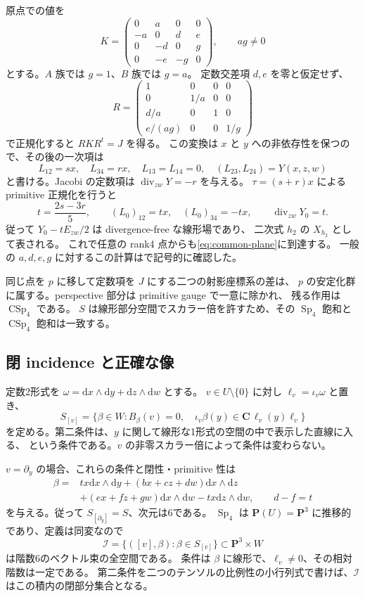 \documentclass[11pt,a4paper]{ltjsarticle}
\newcommand{\CC}{\mathbf C}
\newcommand{\PP}{\mathbf P}
\newcommand{\dd}{\mathrm d}
\DeclareMathOperator{\Sp}{Sp}
\DeclareMathOperator{\CSp}{CSp}
\theoremstyle{remark}
\begin{document}
原点での値を
\[
 K=\begin{pmatrix}
 0&a&0&0\\-a&0&d&e\\0&-d&0&g\\0&-e&-g&0
 \end{pmatrix},\qquad ag\ne0
\]
とする。$A$ 族では $g=1$、$B$ 族では $g=a$。
定数交差項 $d,e$ を零と仮定せず、
\[
 R=\begin{pmatrix}
 1&0&0&0\\0&1/a&0&0\\d/a&0&1&0\\e/(ag)&0&0&1/g
 \end{pmatrix}
\]
で正規化すると $RKR^t=J$ を得る。
この変換は $x$ と $y$ への非依存性を保つので、その後の一次項は
\[
 L_{12}=sx,\quad L_{34}=rx,\quad L_{13}=L_{14}=0,
 \quad(L_{23},L_{24})=Y(x,z,w)
\]
と書ける。Jacobi の定数項は $\operatorname{div}_{zw}Y=-r$ を与える。
$\tau=(s+r)x$ による primitive 正規化を行うと
\[
 t=\frac{2s-3r}{5},\qquad
 (L_0)_{12}=tx,\quad(L_0)_{34}=-tx,\qquad
 \operatorname{div}_{zw}Y_0=t.
\]
従って $Y_0-tE_{zw}/2$ は divergence-free な線形場であり、
二次式 $h_2$ の $X_{h_2}$ として表される。
これで任意の rank4 点からも\eqref{eq:common-plane}に到達する。
一般の $a,d,e,g$ に対するこの計算は\cite{ambient-certificate}で記号的に確認した。

同じ点を $p$ に移して定数項を $J$ にする二つの射影座標系の差は、
$p$ の安定化群に属する。perspective 部分は primitive gauge で一意に除かれ、
残る作用は $\CSp_4$ である。
$S$ は線形部分空間でスカラー倍を許すため、その $\Sp_4$ 飽和と $\CSp_4$ 飽和は一致する。

\subsection{閉 incidence と正確な像}
定数2形式を $\omega=\dd x\wedge\dd y+\dd z\wedge\dd w$ とする。
$v\in U\setminus\{0\}$ に対し $\ell_v=\iota_v\omega$ と置き、
\[
 S_{[v]}=\{\beta\in W:B_\beta(v)=0,\quad
      \iota_v\beta(y)\in\CC\,\ell_v(y)\ell_v\}
\]
を定める。第二条件は、$y$ に関して線形な1形式の空間の中で表示した直線に入る、
という条件である。$v$ の非零スカラー倍によって条件は変わらない。

$v=\partial_y$ の場合、これらの条件と閉性・primitive 性は
\begin{align*}
 \beta={}&t x\dd x\wedge\dd y
 +(b x+c z+d w)\dd x\wedge\dd z\\
 &+(e x+f z+g w)\dd x\wedge\dd w-tx\dd z\wedge\dd w,
 \qquad d-f=t
\end{align*}
を与える。従って $S_{[\partial_y]}=S$、次元は6である。
$\Sp_4$ は $\PP(U)=\PP^3$ に推移的であり、定義は同変なので
\[
 \mathcal I=\{([v],\beta):\beta\in S_{[v]}\}
                  \subset\PP^3\times W
\]
は階数6のベクトル束の全空間である。
条件は $\beta$ に線形で、$\ell_v\ne0$、その相対階数は一定である。
第二条件を二つのテンソルの比例性の小行列式で書けば、$\mathcal I$ はこの積内の閉部分集合となる。
\end{document}
